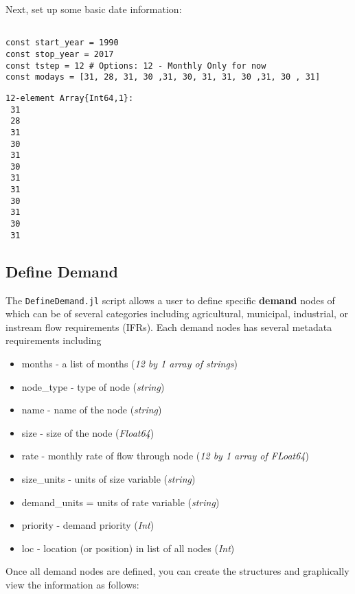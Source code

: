 \documentclass[12pt,a4paper]{article}
\begin{document}
Next, set up some basic date information:


\begin{verbatim}

const start_year = 1990
const stop_year = 2017
const tstep = 12 # Options: 12 - Monthly Only for now
const modays = [31, 28, 31, 30 ,31, 30, 31, 31, 30 ,31, 30 , 31]

\end{verbatim}

\begin{verbatim}
12-element Array{Int64,1}:
 31
 28
 31
 30
 31
 30
 31
 31
 30
 31
 30
 31
\end{verbatim}


\subsection{Define Demand}
The \texttt{DefineDemand.jl} script allows a user to define specific \textbf{demand} nodes  of which can be of several categories including agricultural, municipal, industrial,  or instream flow requirements (IFRs).  Each demand nodes has several metadata requirements including

\begin{itemize}
\item months - a list of months (\emph{12 by 1 array of strings})


\item node\_type - type of node (\emph{string})


\item name - name of the node (\emph{string})


\item size - size of the node (\emph{Float64})


\item rate - monthly rate of flow through node (\emph{12 by 1 array of FLoat64})  


\item size\_units - units of size variable (\emph{string})


\item demand\_units = units of rate variable (\emph{string})


\item priority - demand priority (\emph{Int})


\item loc - location (or position) in list of all nodes (\emph{Int})

\end{itemize}
Once all demand nodes are defined, you can create the structures and  graphically view the information as follows:
\end{document}
